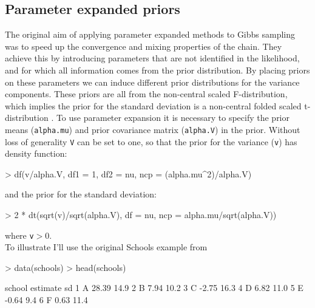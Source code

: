 \documentclass{article}
\begin{document}
\subsection{Parameter expanded priors}
\label{secPX-p}

The original aim of applying parameter expanded methods to Gibbs sampling was to speed up the convergence and mixing properties of the chain. They achieve this by introducing parameters that are not identified in the likelihood, and for which all information comes from the prior distribution. By placing priors on these parameters we can induce different prior distributions for the variance components. These priors are all from the non-central scaled F-distribution, which implies the prior for the standard deviation is a non-central folded scaled t-distribution \citep{Gelman.2006}. To use parameter expansion it is necessary to specify the prior means (\texttt{alpha.mu}) and prior covariance matrix (\texttt{alpha.V}) in the prior. Without loss of generality \texttt{V} can be set to one, so that the prior for the variance (\texttt{v}) has density function:


\begin{Schunk}
\begin{Sinput}
> df(v/alpha.V, df1 = 1, df2 = nu, ncp = (alpha.mu^2)/alpha.V)
\end{Sinput}
\end{Schunk}

and the prior for the standard deviation:

\begin{Schunk}
\begin{Sinput}
> 2 * dt(sqrt(v)/sqrt(alpha.V), df = nu, ncp = alpha.mu/sqrt(alpha.V))
\end{Sinput}
\end{Schunk}

where \texttt{v}$>0$.\\

To illustrate I'll use the original Schools example from \citep{Gelman.2006}

\begin{Schunk}
\begin{Sinput}
> data(schools)
> head(schools)
\end{Sinput}
\begin{Soutput}
  school estimate   sd
1      A    28.39 14.9
2      B     7.94 10.2
3      C    -2.75 16.3
4      D     6.82 11.0
5      E    -0.64  9.4
6      F     0.63 11.4
\end{Soutput}
\end{Schunk}
\end{document}
